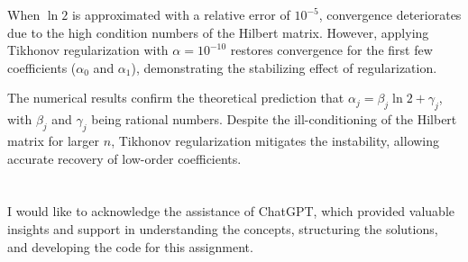 \documentclass[a4paper]{article}
\begin{document}
When \( \ln 2 \) is approximated with a relative error of \( 10^{-5} \), convergence deteriorates due to the high condition numbers of the Hilbert matrix. However, applying Tikhonov regularization with \( \alpha = 10^{-10} \) restores convergence for the first few coefficients (\( \alpha_0 \) and \( \alpha_1 \)), demonstrating the stabilizing effect of regularization.

The numerical results confirm the theoretical prediction that \( \alpha_j = \beta_j \ln 2 + \gamma_j \), with \( \beta_j \) and \( \gamma_j \) being rational numbers. Despite the ill-conditioning of the Hilbert matrix for larger \( n \), Tikhonov regularization mitigates the instability, allowing accurate recovery of low-order coefficients.

\section*{}
I would like to acknowledge the assistance of ChatGPT, which provided valuable insights and support in understanding the concepts, structuring the solutions, and developing the code for this assignment. 
\end{document}
